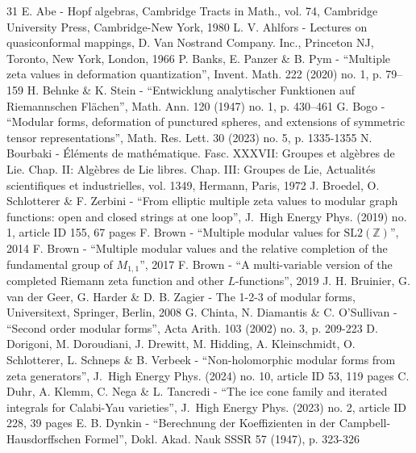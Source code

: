 \documentclass[10pt,a4paper]{article}
\numberwithin{equation}{section}
\theoremstyle{plain}
\theoremstyle{definition}
\begin{document}
\begin{thebibliography}{31}
E. Abe - Hopf algebras, Cambridge Tracts in Math., vol. 74, Cambridge University Press, Cambridge-New York, 1980
L. V. Ahlfors - Lectures on quasiconformal mappings, D. Van Nostrand Company. Inc., Princeton NJ, Toronto, New York, London, 1966
P. Banks, E. Panzer \& B. Pym - “Multiple zeta values in deformation quantization”, Invent. Math. 222 (2020) no. 1, p. 79–159
H. Behnke \& K. Stein - “Entwicklung analytischer Funktionen auf Riemannschen Flächen”, Math. Ann. 120 (1947) no. 1, p. 430–461
G. Bogo - “Modular forms, deformation of punctured spheres, and extensions of symmetric tensor representations”, Math. Res. Lett. 30 (2023) no. 5, p. 1335-1355
N. Bourbaki - Éléments de mathématique. Fasc. XXXVII: Groupes et algèbres de Lie. Chap. II: Algèbres de Lie libres. Chap. III: Groupes de Lie, Actualités scientifiques et industrielles, vol. 1349, Hermann, Paris, 1972
J. Broedel, O. Schlotterer \& F. Zerbini - “From elliptic multiple zeta values to modular graph functions: open and closed strings at one loop”, J. High Energy Phys. (2019) no. 1, article ID 155, 67 pages
F. Brown - “Multiple modular values for $\mathrm{SL}2(\mathbb{Z})$”, 2014
F. Brown - “Multiple modular values and the relative completion of the fundamental group of $M_{1,1}$”, 2017
F. Brown - “A multi-variable version of the completed Riemann zeta function and other $L$-functions”, 2019
J. H. Bruinier, G. van der Geer, G. Harder \& D. B. Zagier - The 1-2-3 of modular forms, Universitext, Springer, Berlin, 2008
G. Chinta, N. Diamantis \& C. O’Sullivan - “Second order modular forms”, Acta Arith. 103 (2002) no. 3, p. 209-223
D. Dorigoni, M. Doroudiani, J. Drewitt, M. Hidding, A. Kleinschmidt, O. Schlotterer, L. Schneps \& B. Verbeek - “Non-holomorphic modular forms from zeta generators”, J. High Energy Phys. (2024) no. 10, article ID 53, 119 pages
C. Duhr, A. Klemm, C. Nega \& L. Tancredi - “The ice cone family and iterated integrals for Calabi-Yau varieties”, J. High Energy Phys. (2023) no. 2, article ID 228, 39 pages
E. B. Dynkin - “Berechnung der Koeffizienten in der Campbell-Hausdorffschen Formel”, Dokl. Akad. Nauk SSSR 57 (1947), p. 323-326

\end{thebibliography}
\end{document}
